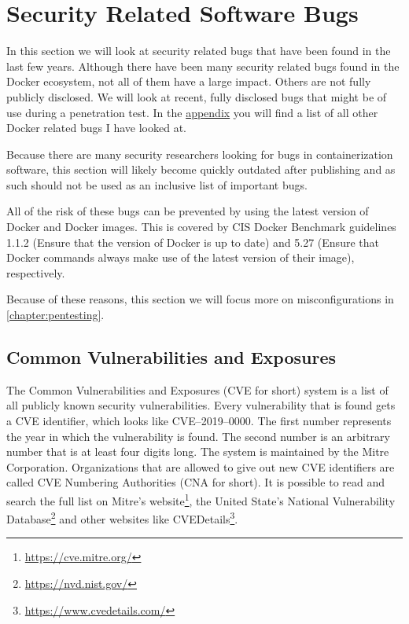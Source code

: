 \section{Security Related Software Bugs}\label{section:bugs}
In this section we will look at security related bugs that have been found in the last few years. Although there have been many security related bugs found in the Docker ecosystem, not all of them have a large impact. Others are not fully publicly disclosed. We will look at recent, fully disclosed bugs that might be of use during a penetration test. In the \hyperref[appendix:CVE-List]{appendix} you will find a list of all other Docker related bugs I have looked at.

\hfill

Because there are many security researchers looking for bugs in containerization software, this section will likely become quickly outdated after publishing and as such should not be used as an inclusive list of important bugs.

All of the risk of these bugs can be prevented by using the latest version of Docker and Docker images. This is covered by CIS Docker Benchmark guidelines 1.1.2 (Ensure that the version of Docker is up to date) and 5.27 (Ensure that Docker commands always make use of the latest version of their image), respectively.

Because of these reasons, this section we will focus more on misconfigurations in \autoref{chapter:pentesting}.

\subsection*{Common Vulnerabilities and Exposures}
The Common Vulnerabilities and Exposures (CVE for short) system is a list of all publicly known security vulnerabilities. Every vulnerability that is found gets a CVE identifier, which looks like CVE--2019--0000. The first number represents the year in which the vulnerability is found. The second number is an arbitrary number that is at least four digits long. The system is maintained by the Mitre Corporation. Organizations that are allowed to give out new CVE identifiers are called CVE Numbering Authorities (CNA for short). It is possible to read and search the full list on Mitre's website\footnote{\url{https://cve.mitre.org/}}, the United State's National Vulnerability Database\footnote{\url{https://nvd.nist.gov/}} and other websites like CVEDetails\footnote{\url{https://www.cvedetails.com/}}.

